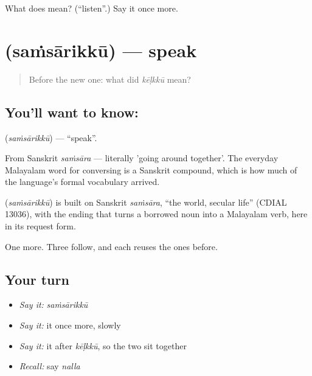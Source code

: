 \begin{tcolorbox}[breakable,colback=teal!4,colframe=teal!35!black,title={Before you move on}]
What does  mean? (\textquotedblleft{}listen\textquotedblright{}.) Say it once more.
\end{tcolorbox}
\section[\texorpdfstring{\ml{സംസാരിക്കൂ} (saṁsārikkū)}{സംസാരിക്കൂ (saṁsārikkū)}]{ (saṁsārikkū) — speak}

\label{lesson:ML-C44-speak}



\begin{quote}
Before the new one: what did \emph{kēḷkkū} mean?
\end{quote}

\subsection*{You'll want to know: }
\textbf{} (\emph{saṁsārikkū}) — \textquotedblleft{}speak\textquotedblright{}.

From Sanskrit \emph{saṁsāra} — literally 'going around together'. The everyday Malayalam word for conversing is a Sanskrit compound, which is how much of the language's formal vocabulary arrived.

\begin{cousinweb}
\textbf{} (\emph{saṁsārikkū}) is built on Sanskrit \emph{saṁsāra}, \textquotedblleft{}the world, secular life\textquotedblright{} (CDIAL 13036), with the ending that turns a borrowed noun into a Malayalam verb, here in its request form.
\end{cousinweb}

\begin{grammarlens}[title={What you've built}]
One more. Three follow, and each reuses the ones before.
\end{grammarlens}

\subsection*{Your turn}
\begin{itemize}
\raggedright
  \item \emph{Say it:} \emph{saṁsārikkū}
  \item \emph{Say it:} it once more, slowly
  \item \emph{Say it:} it after \emph{kēḷkkū}, so the two sit together
  \item \emph{Recall:} say \emph{nalla}
\end{itemize}

